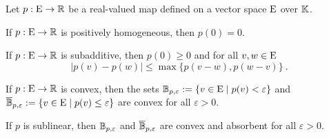  
 \begin{lemma}\label{thm:properties-subadditive-convex-real-valued-maps-vector-space}
   Let $p:\mathrm{E} \to \mathbb{R}$ be a real-valued map defined on a vector space
   $\mathrm{E}$ over $\mathbb{K}$.
   \begin{romanlist}
   \item\label{ite:implications-positive-homogeneity}
     If $p:\mathrm{E} \to \mathbb{R}$ is   positively homogeneous, then $p(0)=0$.
   \item\label{ite:implications-subadditivity}
     If $p:\mathrm{E} \to \mathbb{R}$ is subadditive, then $p(0)\geq 0$ and for all $v,w\in \mathrm{E}$
     \[
       |p(v)-p(w)| \leq \max \{ p(v-w),p(w-v) \} \ .
     \]
   \item\label{ite:implications-convexity-real-valued-map}
     If $p:\mathrm{E} \to \mathbb{R}$ is convex, then the sets
     $\mathbb{B}_{p,\varepsilon} := \{v\in \mathrm{E}\mid p(v) < \varepsilon\} $ and
     $\overline{\mathbb{B}}_{p,\varepsilon} := \{v\in \mathrm{E}\mid p(v) \leq \varepsilon\}$ are convex for all $\varepsilon >0$.
   \item\label{ite:implications-sublinearity-real-valued-map}
     If $p$ is sublinear, then $\mathbb{B}_{p,\varepsilon}$ and
     $\overline{\mathbb{B}}_{p,\varepsilon}$ are convex and
     absorbent for all $\varepsilon >0$.
   \end{romanlist}
 \end{lemma}
